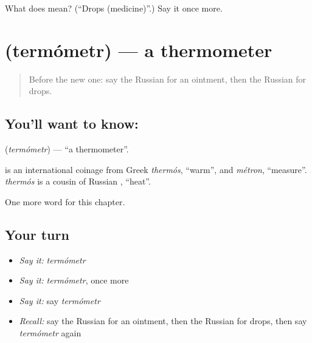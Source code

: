 \begin{tcolorbox}[breakable,colback=teal!4,colframe=teal!35!black,title={Before you move on}]
What does  mean? (\textquotedblleft{}Drops (medicine)\textquotedblright{}.) Say it once more.
\end{tcolorbox}
\section[\texorpdfstring{\ru{термометр} (termómetr)}{термометр (termómetr)}]{ (termómetr) — a thermometer}

\label{lesson:RU-C238-termometr}



\begin{quote}
Before the new one: say the Russian for an ointment, then the Russian for drops.
\end{quote}

\subsection*{You'll want to know: }
\textbf{} (\emph{termómetr}) — \textquotedblleft{}a thermometer\textquotedblright{}.

\begin{cousinweb}
\textbf{} is an international coinage from Greek \emph{thermós}, \textquotedblleft{}warm\textquotedblright{}, and \emph{métron}, \textquotedblleft{}measure\textquotedblright{}. \emph{thermós} is a cousin of Russian \emph{}, \textquotedblleft{}heat\textquotedblright{}.
\end{cousinweb}

\begin{grammarlens}[title={What you've built}]
One more word for this chapter.
\end{grammarlens}

\subsection*{Your turn}
\begin{itemize}
\raggedright
  \item \emph{Say it:} \emph{termómetr}
  \item \emph{Say it:} \emph{termómetr}, once more
  \item \emph{Say it:} say \emph{termómetr}
  \item \emph{Recall:} say the Russian for an ointment, then the Russian for drops, then say \emph{termómetr} again
\end{itemize}

